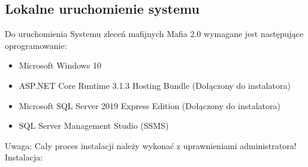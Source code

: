 \documentclass[12pt,a4paper]{article}
\begin{document}
		\subsection{Lokalne uruchomienie systemu}
			Do uruchomienia Systemu zleceń mafijnych Mafia 2.0 wymagane jest następujące oprogramowanie:
			\begin{itemize}
				\item Microsoft Windows 10
				\item ASP.NET Core Runtime 3.1.3 Hosting Bundle (Dołączony do instalatora)
				\item Microsoft SQL Server 2019 Express Edition (Dołączony do instalatora)
				\item SQL Server Management Studio (SSMS)
			\end{itemize}
			Uwaga: Cały proces instalacji należy wykonać z uprawnieniami administratora!\\
			Instalacja:
\end{document}
